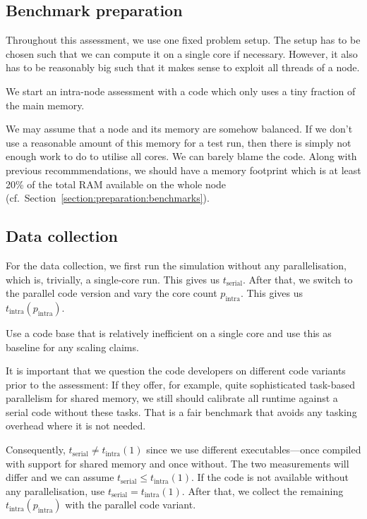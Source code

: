 \subsection{Benchmark preparation}

Throughout this assessment, we use one fixed problem setup.
The setup has to be chosen such that we can compute it on a single core if necessary.
However, it also has to be reasonably big such that it makes sense to exploit all threads of a node.


\begin{assessmentcrime}
 We start an intra-node assessment with a code which only uses a tiny fraction of the main memory.
\end{assessmentcrime}

\noindent
We may assume that a node and its memory are somehow balanced.
If we don't use a reasonable amount of this memory for a test run, then there is simply not enough work to do to utilise all cores.
We can barely blame the code.
Along with previous recommmendations, we should have a memory footprint which is at least 20\% of the total RAM available on the whole node (cf.~Section~\ref{section:preparation:benchmarks}).


\subsection{Data collection}

For the data collection, we first run the simulation without any parallelisation, which is, trivially, a single-core run.  
This gives us $t_{\text{serial}}$.
After that, we switch to the parallel code version and vary the core count $p_{\text{intra}}$. 
This gives us $t_{\text{intra}}(p_{\text{intra}})$.

\begin{assessmentcrime}
 Use a code base that is relatively inefficient on a single core and use this as baseline for any scaling claims.
\end{assessmentcrime}

\noindent
It is important that we question the code developers on different code variants prior to the assessment:
If they offer, for example, quite sophisticated task-based parallelism for shared memory, we still should calibrate all runtime against a serial code without these tasks.
That is a fair benchmark that avoids any tasking overhead where it is not needed.

Consequently, $t_{\text{serial}} \not= t_{\text{intra}}(1)$ since we use different executables---once compiled with support for shared memory and once without.
The two measurements will differ and we can assume $t_{\text{serial}} \leq t_{\text{intra}}(1)$.
If the code is not available without any parallelisation, use $t_{\text{serial}} = t_{\text{intra}}(1)$.
After that, we collect the remaining $t_{\text{intra}}(p_{\text{intra}})$ with the parallel code variant.

